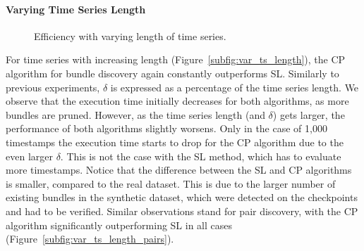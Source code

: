 \paragraph{Varying Time Series Length}
\begin{figure}[tb]
 \centering
 \caption{Efficiency with varying length of time series.}
 \label{fig:exp5}
\end{figure}

For time series with increasing length (Figure~\ref{subfig:var_ts_length}), the CP algorithm for bundle discovery again constantly outperforms SL. Similarly to previous experiments, $\delta$ is expressed as a percentage of the time series length. We observe that the execution time initially decreases for both algorithms, as more bundles are pruned. However, as the time series length (and $\delta$) gets larger, the performance of both algorithms slightly worsens. Only in the case of 1,000 timestamps the execution time starts to drop for the CP algorithm due to the even larger $\delta$. This is not the case with the SL method, which has to evaluate more timestamps. Notice that the difference between the SL and CP algorithms is smaller, compared to the real dataset. This is due to the larger number of existing bundles in the synthetic dataset, which were detected on the checkpoints and had to be verified. Similar observations stand for pair discovery, with the CP algorithm significantly outperforming SL in all cases (Figure~\ref{subfig:var_ts_length_pairs}).